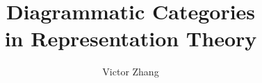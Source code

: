 \documentclass{beamer}
\title{Diagrammatic Categories\\in Representation Theory}
\author{Victor Zhang}
\date{}
\begin{document}
\maketitle
\author{}




\end{document}

